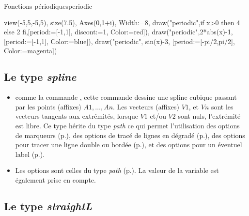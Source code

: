 \begin{demo}{Fonctions périodiques}{periodic}
\begin{texgraph}[name=periodic]
view(-5,5,-5,5), size(7.5),
Axes(0,1+i), Width:=8,
draw("periodic",if x>0 then 4 else 2 fi,[period:=[-1,1],
 discont:=1, Color:=red]),
draw("periodic",2*abs(x)-1,[period:=[-1,1], Color:=blue]),
draw("periodic", sin(x)-3, [period:=[-pi/2,pi/2],
 Color:=magenta])
\end{texgraph}
\end{demo}

\subsection{Le type \emph{spline}}\label{typespline}

{\centering {}\par}

\begin{itemize}
 \item \desc comme la commande , cette commande dessine une spline cubique passant par les points (affixes) $A1,\ldots,An$. Les vecteurs (affixes) $V1$, et $Vn$ sont les vecteurs tangents aux extrémités, lorsque $V1$ et/ou $V2$ sont nuls, l'extrémité est libre. Ce type hérite du type \emph{path} ce qui permet l'utilisation des options de marqueurs (p.\pageref{marqueurs}), des options de tracé de lignes en dégradé (p.\pageref{gradLines}), des options pour tracer une ligne double ou bordée (p.\pageref{optionsline}), et des options pour un éventuel label (p.\pageref{optionslabels}). 
 \item Les options sont celles du type \emph{path} (p.\pageref{typepath}). La valeur de la variable  est également prise en compte.
\end{itemize}


\subsection{Le type \emph{straightL}}

{\centering {}\par}\label{typestraightL}

